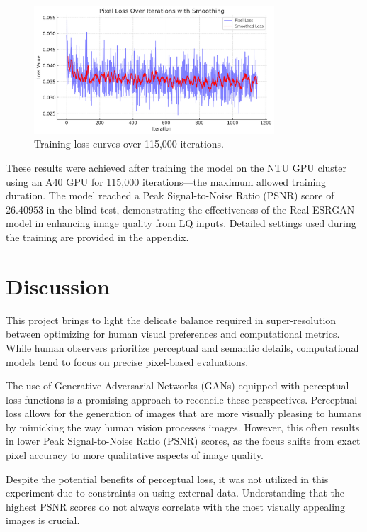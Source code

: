 \documentclass{article}
\begin{document}
\begin{figure}[htbp]
    \centering
    \includegraphics[width=0.8\textwidth]{imgs/losses.png}
    \caption{Training loss curves over 115,000 iterations.}
    \label{fig:image5}
\end{figure}

These results were achieved after training the model on the NTU GPU cluster using an A40 GPU for 115,000 iterations—the maximum allowed training duration. The model reached a Peak Signal-to-Noise Ratio (PSNR) score of $26.40953$ in the blind test, demonstrating the effectiveness of the Real-ESRGAN model in enhancing image quality from LQ inputs. Detailed settings used during the training are provided in the appendix.

\section{Discussion}
\label{sec:Discussion} %

This project brings to light the delicate balance required in super-resolution between optimizing for human visual preferences and computational metrics. While human observers prioritize perceptual and semantic details, computational models tend to focus on precise pixel-based evaluations.

The use of Generative Adversarial Networks (GANs) equipped with perceptual loss functions is a promising approach to reconcile these perspectives. Perceptual loss allows for the generation of images that are more visually pleasing to humans by mimicking the way human vision processes images. However, this often results in lower Peak Signal-to-Noise Ratio (PSNR) scores, as the focus shifts from exact pixel accuracy to more qualitative aspects of image quality.

Despite the potential benefits of perceptual loss, it was not utilized in this experiment due to constraints on using external data. Understanding that the highest PSNR scores do not always correlate with the most visually appealing images is crucial. 
\end{document}
